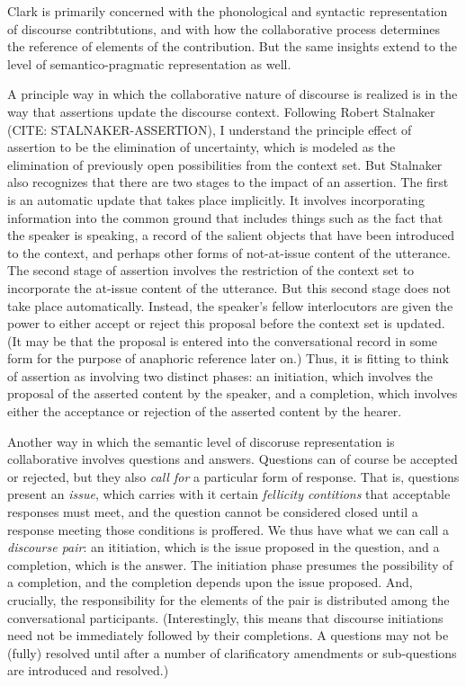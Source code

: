 \documentclass[letterpaper,]{article}
\begin{document}
Clark is primarily concerned with the phonological and syntactic
representation of discourse contribtutions, and with how the
collaborative process determines the reference of elements of the
contribution. But the same insights extend to the level of
semantico-pragmatic representation as well.

A principle way in which the collaborative nature of discourse is
realized is in the way that assertions update the discourse context.
Following Robert Stalnaker (CITE: STALNAKER-ASSERTION), I understand the
principle effect of assertion to be the elimination of uncertainty,
which is modeled as the elimination of previously open possibilities
from the context set. But Stalnaker also recognizes that there are two
stages to the impact of an assertion. The first is an automatic update
that takes place implicitly. It involves incorporating information into
the common ground that includes things such as the fact that the speaker
is speaking, a record of the salient objects that have been introduced
to the context, and perhaps other forms of not-at-issue content of the
utterance. The second stage of assertion involves the restriction of the
context set to incorporate the at-issue content of the utterance. But
this second stage does not take place automatically. Instead, the
speaker's fellow interlocutors are given the power to either accept or
reject this proposal before the context set is updated. (It may be that
the proposal is entered into the conversational record in some form for
the purpose of anaphoric reference later on.) Thus, it is fitting to
think of assertion as involving two distinct phases: an initiation,
which involves the proposal of the asserted content by the speaker, and
a completion, which involves either the acceptance or rejection of the
asserted content by the hearer.

Another way in which the semantic level of discoruse representation is
collaborative involves questions and answers. Questions can of course be
accepted or rejected, but they also \emph{call for} a particular form of
response. That is, questions present an \emph{issue}, which carries with
it certain \emph{fellicity contitions} that acceptable responses must
meet, and the question cannot be considered closed until a response
meeting those conditions is proffered. We thus have what we can call a
\emph{discourse pair}: an ititiation, which is the issue proposed in the
question, and a completion, which is the answer. The initiation phase
presumes the possibility of a completion, and the completion depends
upon the issue proposed. And, crucially, the responsibility for the
elements of the pair is distributed among the conversational
participants. (Interestingly, this means that discourse initiations need
not be immediately followed by their completions. A questions may not be
(fully) resolved until after a number of clarificatory amendments or
sub-questions are introduced and resolved.)
\end{document}
